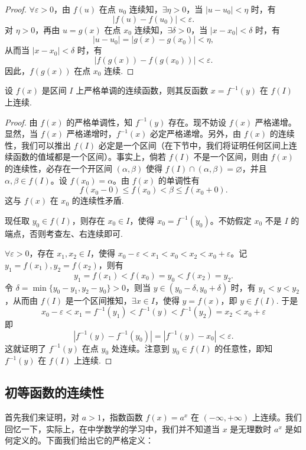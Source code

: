 \begin{proof}
$\forall\varepsilon>0$，由 $f(u)$ 在点 $u_0$ 连续知，$\exists\eta>0$，当 $|u-u_0|<\eta$ 时，有
\[
  |f(u)-f(u_0)|<\varepsilon.
\]
对 $\eta>0$，再由 $u=g(x)$ 在点 $x_0$ 连续知，$\exists\delta>0$，当 $|x-x_0|<\delta$ 时，有
\[
  |u-u_0|=|g(x)-g(x_0)|<\eta,
\]
从而当 $|x-x_0|<\delta$ 时，有
\[
  |f(g(x))-f(g(x_0))|<\varepsilon.
\]
因此，$f(g(x))$ 在点 $x_0$ 连续.
\end{proof}


\begin{theorem}[{反函数的连续性}]\label{theorem:ma-3-2-2}
设 $f(x)$ 是区间 $I$ 上严格单调的连续函数，则其反函数 $x=f^{-1}(y)$ 在 $f(I)$ 上连续.
\end{theorem}


\begin{proof}
由 $f(x)$ 的严格单调性，知 $f^{-1}(y)$ 存在。现不妨设 $f(x)$ 严格递增。显然，当 $f(x)$ 严格递增时，$f^{-1}(x)$ 必定严格递增。另外，由 $f(x)$ 的连续性，我们可以推出 $f(I)$ 必定是一个区间（在下节中，我们将证明任何区间上连续函数的值域都是一个区间）。事实上，倘若 $f(I)$ 不是一个区间，则由 $f(x)$ 的连续性，必存在一个开区间 $(\alpha,\beta)$ 使得 $f(I)\cap(\alpha,\beta)=\varnothing$，并且 $\alpha,\beta\in f(I)$。设 $f(x_0)=\alpha$。由 $f(x)$ 的单调性有
\[
  f(x_0-0)\leqslant f(x_0)<\beta\leqslant f(x_0+0).
\]
这与 $f(x)$ 在 $x_0$ 的连续性矛盾.

现任取 $y_0\in f(I)$，则存在 $x_0\in I$，使得 $x_0=f^{-1}(y_0)$。不妨假定 $x_0$ 不是 $I$ 的端点，否则考查左、右连续即可.

$\forall\varepsilon>0$，存在 $x_1,x_2\in I$，使得 $x_0-\varepsilon<x_1<x_0<x_2<x_0+\varepsilon$。记 $y_1=f(x_1),y_2=f(x_2)$，则有
\[
  y_1=f(x_1)<f(x_0)=y_0<f(x_2)=y_2.
\]
令 $\delta=\min\{y_0-y_1,y_2-y_0\}>0$，则当 $y\in(y_0-\delta,y_0+\delta)$ 时，有 $y_1<y<y_2$，从而由 $f(I)$ 是一个区间推知，$\exists x\in I$，使得 $y=f(x)$，即 $y\in f(I)$.
于是
\[
  x_0-\varepsilon<x_1=f^{-1}(y_1)<f^{-1}(y)<f^{-1}(y_2)=x_2<x_0+\varepsilon
\]
即
\[
  |f^{-1}(y)-f^{-1}(y_0)|=|f^{-1}(y)-x_0|<\varepsilon.
\]
这就证明了 $f^{-1}(y)$ 在点 $y_0$ 处连续。注意到 $y_0\in f(I)$ 的任意性，即知 $f^{-1}(y)$ 在 $f(I)$ 上连续.
\end{proof}


\subsection{初等函数的连续性}
\label{subsec:ma-3-2-3}

首先我们来证明，对 $a>1$，指数函数 $f(x)=a^x$ 在 $(-\infty,+\infty)$ 上连续。我们回忆一下，实际上，在中学数学的学习中，我们并不知道当 $x$ 是无理数时 $a^x$ 是如何定义的。下面我们给出它的严格定义：

